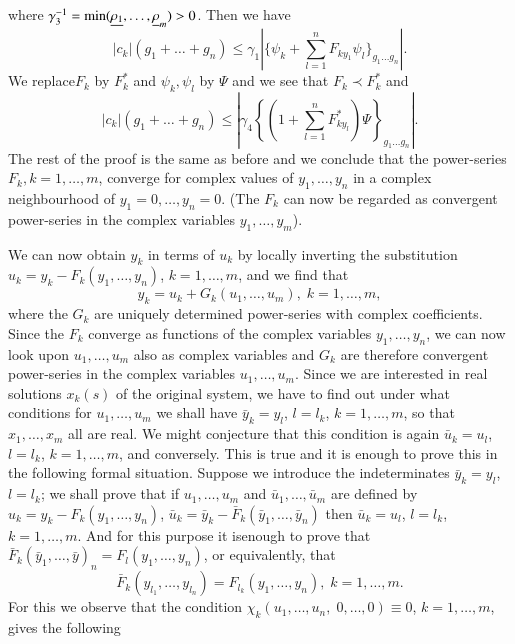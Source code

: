where $\gamma^{-1}_3 = \min (\underline{\rho_1}, \ldots, \underline{\rho}_m) > 0$. Then we have 
$$
|c_k|(g_1+ \ldots + g_n) \leq \gamma_1 |\{\psi_k+ \sum\limits^n_{l=1}
F_{ky_1} \psi_l\}_{g_1 \ldots g_n}|. 
$$
We replace\pageoriginale $F_k$ by $F^*_k$ and $\psi_k, \psi_l$ by
$\Psi$ and we see that $F_k \prec F^*_k$ and  
$$
|c_k| (g_1 + \ldots + g_n) \leq | \gamma_4 \left\{ (1+
\sum\limits^n_{l=1} F^*_{ky_l}) \Psi\right\}_{g_1 \ldots g_n}|. 
$$
The rest of the proof is the same as before and we conclude that the
power-series $F_k, k =1, \ldots, m$, converge for complex values of
$y_1, \ldots, y_n$ in a complex neighbourhood of $y_1 = 0, \ldots, y_n
= 0$. (The $F_k$ can now be regarded as convergent power-series in the
complex variables $y_1, \ldots, y_m$).  

We can now obtain $y_k$ in terms of $u_k$ by locally inverting the
substitution $u_k = y_k - F_k (y_1, \ldots, y_n)$, $k = 1, \ldots, m$,
and we find that  
\begin{equation*}
y_k = u_k + G_k (u_1, \ldots, u_m), \; k = 1, \ldots,
m,\tag{3.5.52}\label{chap3:eq3.5.52} 
\end{equation*}
where the $G_k$ are uniquely determined power-series with complex
coefficients. Since the $F_k$ converge as functions of the complex
variables $y_1, \ldots, y_n$, we can now look upon $u_1, \ldots, u_m$
also as complex variables and $G_k$ are therefore convergent
power-series in the complex variables $u_1, \ldots, u_m$. Since we are
interested in real solutions $x_k(s)$ of the original system, we have
to find out under what conditions for $u_1, \ldots, u_m$ we shall have
$\bar{y}_k = y_l$, $l = l_k$, $k =1, \ldots, m$, so that $x_1, \ldots,
x_m$ all are real. We might conjecture that this condition is again
$\bar{u}_k = u_l$, $l = l_k$, $k=1, \ldots, m$, and conversely. This
is true and it is enough to prove this in the following formal
situation. Suppose we introduce the indeterminates $\bar{y}_k = y_l$,
$l = l_k$; we shall prove that if $u_1,\ldots, u_m$ and $\bar{u}_1,
\ldots, \bar{u}_m$ are defined by $u_k = y_k - F_k(y_1, \ldots, y_n)$,
$\bar{u}_k = \bar{y}_k - \bar{F}_k (\bar{y}_1, \ldots, \bar{y}_n)$
then $\bar{u}_k = u_l$, $l = l_k$, $k=1, \ldots, m$. And for this
purpose it is\pageoriginale enough to prove that $\bar{F}_k
(\bar{y}_1,\ldots, \bar{y})_n  = F_l (y_1, \ldots, y_n)$, or
equivalently, that  
$$
\bar{F}_k(y_{l_1}, \ldots, y_{l_n}) = F_{l_k} (y_1, \ldots, y_n), \; k
= 1, \ldots, m.  
$$
For this we observe that the condition $\chi_k (u_1, \ldots, u_n, \;
0, \ldots, 0) \equiv 0$, $k = 1, \ldots, m$, gives the following
